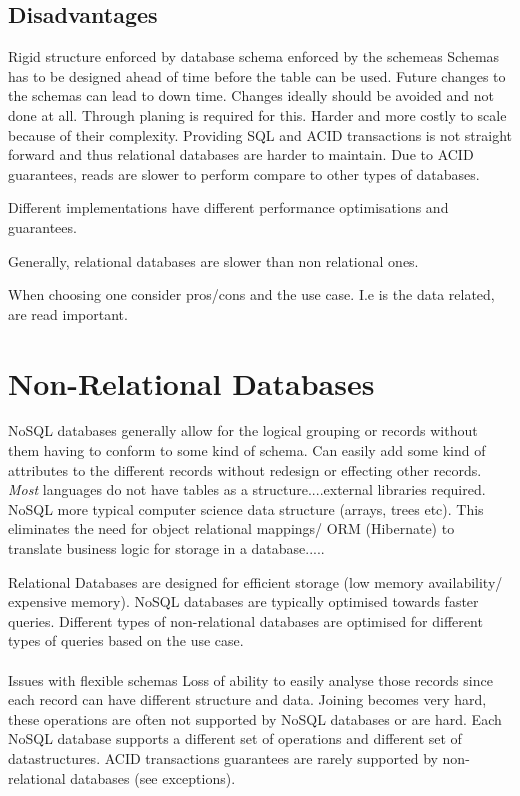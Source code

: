 \documentclass[a4paper, 11pt]{book}
\begin{document}
    \subsection{Disadvantages}
    Rigid structure enforced by database schema enforced by the schemeas
    Schemas has to be designed ahead of time before the table can be used.
    Future changes to the schemas can lead to down time.
    Changes ideally should be avoided and not done at all.
    Through planing is required for this.
    Harder and more costly to scale because of their complexity.
    Providing SQL and ACID transactions is not straight forward and thus relational databases are harder to maintain.
    Due to ACID guarantees, reads are slower to perform compare to other types of databases.

    Different implementations have different performance optimisations and guarantees.

    Generally, relational databases are slower than non relational ones.

    When choosing one consider pros/cons and the use case.
    I.e is the data related, are read important.

    \section{Non-Relational Databases}
    NoSQL databases generally allow for the logical grouping or records without them having to conform to some kind of schema.
    Can easily add some kind of attributes to the different records without redesign or effecting other records.
    \textit{Most} languages do not have tables as a structure....external libraries required.
    NoSQL more typical computer science data structure (arrays, trees etc).
    This eliminates the need for object relational mappings/ ORM (Hibernate) to translate business logic for storage in a database.....

    Relational Databases are designed for efficient storage (low memory availability/ expensive memory).
    NoSQL databases are typically optimised towards faster queries.
    Different types of non-relational databases are optimised for different types of queries based on the use case.

    \paragraph{}
    Issues with flexible schemas
    Loss of ability to easily analyse those records since each record can have different structure and data.
    Joining becomes very hard, these operations are often not supported by NoSQL databases or are hard.
    Each NoSQL database supports a different set of operations and different set of datastructures.
    ACID transactions guarantees are rarely supported by non-relational databases (see exceptions).
\end{document}
